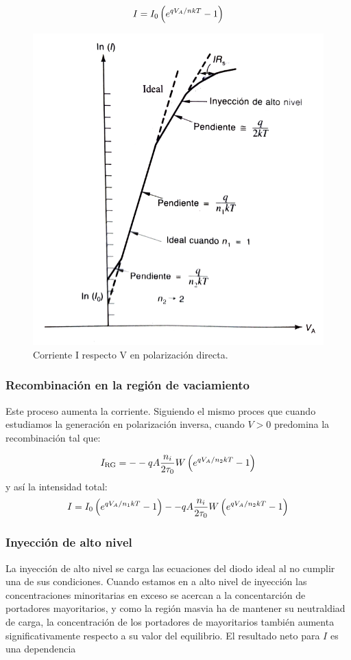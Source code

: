 \begin{equation}
    I = I_0 \left( e^{qV_A/nkT}-1 \right)
\end{equation}
\begin{figure}[h!] \centering
    \includegraphics[width=0.5\linewidth]{Cuerpo/Ch_03/03_Temario_11.png}
    \caption{Corriente I respecto V en polarización directa.}
\end{figure}


\subsubsection{Recombinación en la región de vaciamiento}

Este proceso aumenta la corriente. Siguiendo el mismo proces que cuando estudiamos la generación en polarización inversa, cuando $V>0$ predomina la recombinación tal que: 

\begin{equation}
    I_{\text{RG}} = - -q A \frac{n_i}{2\tau_0} W \left( e^{qV_A/n_2kT}-1 \right)
\end{equation}
y así la intensidad total: 
\begin{equation}
    I = I_0 \left( e^{qV_A/n_1kT}-1 \right) - -q A \frac{n_i}{2\tau_0} W \left( e^{qV_A/n_2kT}-1 \right)
\end{equation}

\subsubsection{Inyección de alto nivel}

La inyección de alto nivel se carga las ecuaciones del diodo ideal al no cumplir una de sus condiciones. Cuando estamos en a alto nivel de inyección las concentraciones minoritarias en exceso se acercan a la concentarción de portadores mayoritarios, y como la región masvia ha de mantener su neutraldiad de carga, la concentración de los portadores de mayoritarios también aumenta significativamente respecto a su valor del equilibrio. El resultado neto para $I$ es una dependencia 


